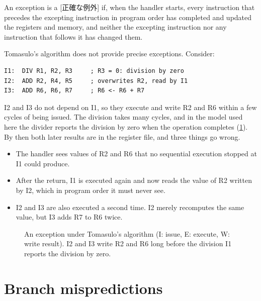 \documentclass[../main.tex]{subfiles}
\begin{document}
\begin{definition}
  \label{def:l08-precise}
  An exception is a [正確な例外] if, when the
  handler starts, every instruction that precedes the excepting instruction
  in program order has completed and updated the registers and memory, and
  neither the excepting instruction nor any instruction that follows it has
  changed them.
\end{definition}

Tomasulo's algorithm does not provide precise exceptions.  Consider:
\begin{lstlisting}[language={[x86masm]Assembler}, numbers=none]
I1:  DIV R1, R2, R3     ; R3 = 0: division by zero
I2:  ADD R2, R4, R5     ; overwrites R2, read by I1
I3:  ADD R6, R6, R7     ; R6 <- R6 + R7
\end{lstlisting}
I2 and I3 do not depend on I1, so they execute and write R2 and R6 within a
few cycles of being issued.  The division takes many cycles, and in the model
used here the divider reports the division by zero when the operation
completes (\cref{fig:l08-exception}).  By then both later results are in the
register file, and three things go wrong.
\begin{itemize}
  \item The handler sees values of R2 and R6 that no sequential execution
    stopped at I1 could produce.
  \item After the return, I1 is executed again and now reads the value of R2
    written by I2, which in program order it must never see.
  \item I2 and I3 are also executed a second time.  I2 merely recomputes the
    same value, but I3 adds R7 to R6 twice.
\end{itemize}

\begin{figure}[htbp]
  \centering
  
  \caption{An exception under Tomasulo's algorithm (I: issue, E: execute,
    W: write result).  I2 and I3 write R2 and R6 long before the division I1
    reports the division by zero.}
  \label{fig:l08-exception}
\end{figure}

\section{Branch mispredictions}
\label{sec:l08-mispredictions}
\end{document}
